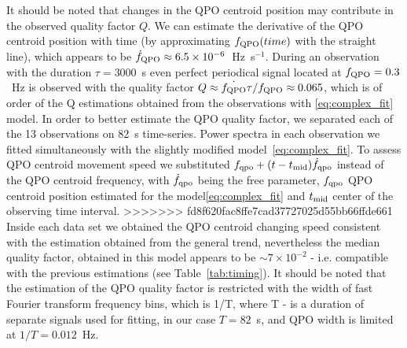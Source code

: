 \documentclass[a4paper,fleqn,usenatbib]{mnras}
\begin{document}
It should be noted that  changes in the QPO centroid position may contribute in the observed quality factor $Q$.
We can estimate the derivative of the QPO centroid position with time (by approximating $f_{\rm QPO}(time)$ with the straight line), which appears to be $\dot{f}_{\rm QPO} \approx 6.5\times10^{-6}$~Hz~s$^{-1}$. 
During an observation with the duration $\tau = 3000$~s even perfect periodical signal located at $f_{\rm QPO}=0.3$~Hz is observed with the quality factor $Q \approx \dot{f_{\rm QPO}}\tau/f_{\rm QPO} \approx 0.065$, which is of order of the Q estimations obtained from the observations with \ref{eq:complex_fit} model.
In order to better estimate the QPO quality factor, we separated each of the 13 observations on 82~s time-series. 
Power spectra in each observation we fitted simultaneously with the slightly modified model~\ref{eq:complex_fit}.
To assess QPO centroid movement speed we substituted $f_{\rm qpo} + (t - t_{\rm mid})\dot{f}_{\rm qpo}$ instead of the QPO centroid frequency, with $\dot{f}_{\rm qpo}$ being the free parameter, $f_{\rm qpo}$ QPO centroid position estimated for the model\ref{eq:complex_fit}  and $t_{\rm mid}$ center of the observing time interval. 
>>>>>>> fd8f620fac8ffe7cad37727025d55bb66ffde661
Inside each data set we obtained the QPO centroid changing speed consistent with the estimation obtained from the general trend, nevertheless the median quality factor, obtained in this model appears to be $\sim7\times10^{-2}$ - i.e. compatible with the previous estimations (see Table~\ref{tab:timing}). 
It should be noted that the estimation of the QPO quality factor is restricted with the width of fast Fourier transform frequency bins, which is 1/T, where T - is a duration of separate signals used for fitting, in our case $T=82$~s, and QPO width is limited at $1/T = 0.012$~Hz.
\end{document}
